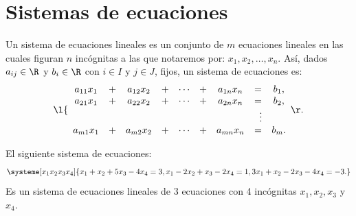 \documentclass[compacto,10pt]{pubciencias-notas}
\begin{document}
\encabezado

\vspace*{-8mm}

\setcounter{section}{1}
\section{Sistemas de ecuaciones}

\begin{defi}
    Un sistema de ecuaciones lineales es un conjunto de $m$ ecuaciones lineales en las cuales figuran $n$ incógnitas a las que notaremos por: $x_1, x_2, \ldots, x_n$. Así, dados $a_{ij}\in\R$ y $b_i\in \R$ con $i\in I$ y $j\in J$, fijos, un sistema de ecuaciones es:
    \[
    \l\{
    \begin{array}{cccccccccc}
        a_{11}x_1& + &a_{12}x_2& + &\cdots &+& a_{1n}x_n &= &b_1,\\
        a_{21}x_1& + &a_{22}x_2& + &\cdots &+& a_{2n}x_n &= &b_2,\\
                &&&    &            &        & &\hspace{2mm} \vdots&\\
        a_{m1}x_1& + &a_{m2}x_2& + &\cdots &+& a_{mn}x_n &= &b_m.
    \end{array}
    \r.
    \]
\end{defi}

\begin{ejem}
El siguiente sistema de ecuaciones:
\[
    \systeme[x_1 x_2 x_3 x_4]{x_1 +x_2 +5x_3 -4x_4=3, x_1 -2x_2 +x_3 -2x_4=1, 3x_1 +x_2 -2x_3 -4x_4=-3.}
\]
Es un sistema de ecuaciones lineales de 3 ecuaciones con 4 incógnitas $x_1, x_2, x_3$ y $x_4$. 
\end{ejem}
\end{document}
